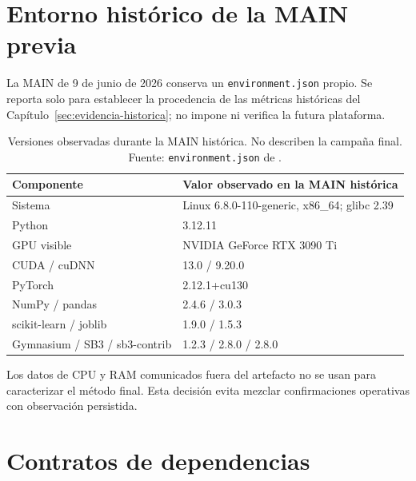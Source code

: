 
\section{Entorno histórico de la MAIN previa}

La MAIN de 9 de junio de 2026 conserva un \texttt{environment.json} propio. Se reporta solo para establecer la procedencia de las métricas históricas del Capítulo~\ref{sec:evidencia-historica}; no impone ni verifica la futura plataforma.

\begin{table}[htbp]
\centering
\small
\begin{tabular}{p{4.0cm}p{7.8cm}}
\toprule
Componente & Valor observado en la MAIN histórica \\
\midrule
Sistema & Linux 6.8.0-110-generic, x86\_64; glibc 2.39 \\
Python & 3.12.11 \\
GPU visible & NVIDIA GeForce RTX 3090 Ti \\
CUDA / cuDNN & 13.0 / 9.20.0 \\
PyTorch & 2.12.1+cu130 \\
NumPy / pandas & 2.4.6 / 3.0.3 \\
scikit-learn / joblib & 1.9.0 / 1.5.3 \\
Gymnasium / SB3 / sb3-contrib & 1.2.3 / 2.8.0 / 2.8.0 \\
\bottomrule
\end{tabular}
\caption[Runtime de la MAIN histórica]{Versiones observadas durante la MAIN histórica. No describen la campaña final. Fuente: \texttt{environment.json} de .}
\label{tab:runtime-main}
\end{table}

Los datos de CPU y RAM comunicados fuera del artefacto no se usan para caracterizar el método final. Esta decisión evita mezclar confirmaciones operativas con observación persistida.

\section{Contratos de dependencias}


